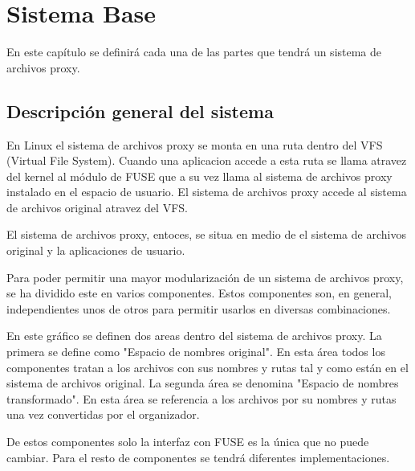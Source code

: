 \chapter{Sistema Base}
\ifpdf
    \graphicspath{{Chapter1/Chapter1Figs/PNG/}{Chapter1/Chapter1Figs/PDF/}{Chapter1/Chapter1Figs/}}
\else
    \graphicspath{{Chapter1/Chapter1Figs/EPS/}{Chapter1/Chapter1Figs/}}
\fi

En este capítulo se definirá cada una de las partes que tendrá un sistema de archivos proxy.

\section{Descripción general del sistema}

En Linux el sistema de archivos proxy se monta en una ruta dentro del VFS (Virtual File System). Cuando una aplicacion accede a esta ruta se llama atravez del kernel al módulo de FUSE que a su vez llama al sistema de archivos proxy instalado en el espacio de usuario. El sistema de archivos proxy accede al sistema de archivos original atravez del VFS.


El sistema de archivos proxy, entoces, se situa en medio de el sistema de archivos original y la aplicaciones de usuario.


Para poder permitir una mayor modularización de un sistema de archivos proxy, se ha dividido este en varios componentes. Estos componentes son, en general, independientes unos de otros para permitir usarlos en diversas combinaciones.


En este gráfico se definen dos areas dentro del sistema de archivos proxy. La primera se define como "Espacio de nombres original". En esta área todos los componentes tratan a los archivos con sus nombres y rutas tal y como están en el sistema de archivos original. La segunda área se denomina "Espacio de nombres transformado". En esta área se referencia a los archivos por su nombres y rutas una vez convertidas por el organizador.

De estos componentes solo la interfaz con FUSE es la única que no puede cambiar. Para el resto de componentes se tendrá diferentes implementaciones.


